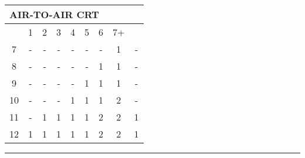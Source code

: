 

{\ttfamily
\begin{tabular}{|c|c|c|c|c|c|c|c|c|}
  \multicolumn{9}{l}{AIR-TO-AIR CRT} \\\hline
  \cline{2-8}
    & 1 & 2 & 3 & 4 & 5 & 6 & 7+ &  \\\hline
  7 & - & - & - & - & - & - & 1 & - \\
  8 & - & - & - & - & - & 1 & 1 & - \\
  9 & - & - & - & - & 1 & 1 & 1 & - \\
  10 & - & - & - & 1 & 1 & 1 & 2 & - \\
  \cline{7-8}
  11 & - & 1 & 1 & 1 & 1 & 2 & 2 & 1 \\
  \cline{5-6}
  12 & 1 & 1 & 1 & 1 & 1 & 2 & 2 & 1 \\\hline
\end{tabular} 
}

\vspace{1em}
\hrule
\vspace{1em}
